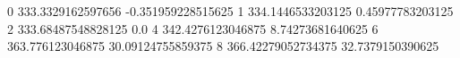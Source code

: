 0 333.3329162597656 -0.351959228515625
1 334.1446533203125 0.45977783203125
2 333.68487548828125 0.0
4 342.4276123046875 8.74273681640625
6 363.776123046875 30.09124755859375
8 366.42279052734375 32.7379150390625
